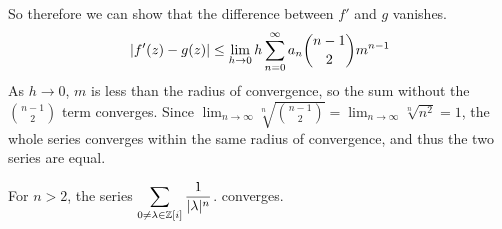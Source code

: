 \documentclass{homework}
\begin{document}
\begin{solution}
\begin{align*}
                                                                                                                                    \end{align*}
                                                                                                                                    So therefore we can show that the difference between $f'$ and $g$ vanishes.
                                                                                                                                    \begin{align*}
                                                                                                                                    \left|f'(z)-g(z)\right|\leq \lim_{h\to 0}h \sum_{n=0}^\infty a_n\binom{n-1}{2}m^{n-1}
                                                                                                                                    \end{align*}
                                                                                                                                    As $h\to 0$, $m$ is less than the radius of convergence, so the sum without the $\binom{n-1}{2}$ term converges. Since $\lim_{n\to\infty} \sqrt[n]{\binom{n-1}{2}} = \lim_{n\to\infty} \sqrt[n]{n^2} = 1$,
                                                                                                                                    the whole series converges within the same radius of convergence, and thus the two series are equal.

                                                                                                                                    \end{solution}
                                                                                                                                    \begin{problem}\label{sum-one-over-gaussian-integers}For $n > 2$, the
                                                                                                                                      series \( \displaystyle\sum_{0 \neq \lambda \in \mathbb{Z}[i]} \frac{1}{|\lambda|^n} \).
                                                                                                                                        converges.
                                                                                                                                        \end{problem}
\end{document}
